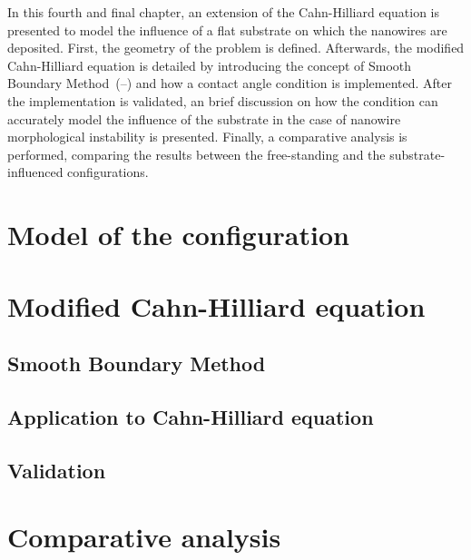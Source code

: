 In this fourth and final chapter, an extension of the Cahn-Hilliard equation is presented to model the influence of a flat substrate on which the nanowires are deposited. First, the geometry of the problem is defined. Afterwards, the modified Cahn-Hilliard equation is detailed by introducing the concept of Smooth Boundary Method (\cite{YuChenThornton2009}\nocite{YuChenThornton2012}\nocite{SinhababuBhattacharya2022}\nocite{YangWangKim2022}--\cite{LiChoiKim2016}) and how a contact angle condition is implemented. After the implementation is validated, an brief discussion on how the condition can accurately model the influence of the substrate in the case of nanowire morphological instability is presented. Finally, a comparative analysis is performed, comparing the results between the free-standing and the substrate-influenced configurations. 
\section{Model of the configuration}
    \lipsum[1]
\section{Modified Cahn-Hilliard equation}
    \subsection{Smooth Boundary Method}
        \lipsum[1]
    \subsection{Application to Cahn-Hilliard equation}
        \lipsum[1]
    \subsection{Validation}
        \lipsum[1]
\section{Comparative analysis}
    \lipsum[1]